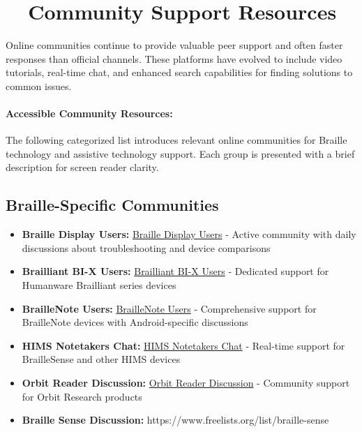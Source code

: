 \section{~~Community Support Resources}
\label{app2:listserv2}
Online communities continue to provide valuable peer support and often faster responses than official channels. These platforms have evolved to include video tutorials, real-time chat, and enhanced search capabilities for finding solutions to common issues.

\paragraph{Accessible Community Resources:}
The following categorized list introduces relevant online communities for Braille technology and assistive technology support. Each group is presented with a brief description for screen reader clarity.

\subsection{Braille-Specific Communities}
\label{app2:braille-communities}
\begin{itemize}
	\item \textbf{Braille Display Users:} \href{https://groups.io/g/braille-display-users}{Braille Display Users} - Active community with daily discussions about troubleshooting and device comparisons
	\item \textbf{Brailliant BI-X Users:} \href{https://groups.io/g/Brailliant-BI-X-USERS/}{Brailliant BI-X Users} - Dedicated support for Humanware Brailliant series devices
	\item \textbf{BrailleNote Users:} \href{https://groups.io/g/braillenote}{BrailleNote Users} - Comprehensive support for BrailleNote devices with Android-specific discussions
	\item \textbf{HIMS Notetakers Chat:} \href{https://groups.io/g/hims-notetakers-chat}{HIMS Notetakers Chat} - Real-time support for BrailleSense and other HIMS devices
	\item \textbf{Orbit Reader Discussion:} \href{https://groups.io/g/orbit-reader}{Orbit Reader Discussion} - Community support for Orbit Research products
	\item \textbf{Braille Sense Discussion:} https://www.freelists.org/list/braille-sense
\end{itemize}

